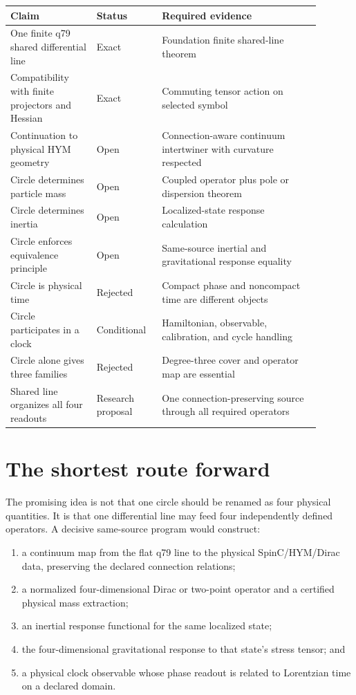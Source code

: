 \documentclass[11pt]{article}
\begin{document}
\begin{center}
\begin{tabular}{p{0.25\linewidth}p{0.18\linewidth}p{0.46\linewidth}}
\hline
Claim & Status & Required evidence\\
\hline
One finite q79 shared differential line & Exact & Foundation finite
shared-line theorem\\
Compatibility with finite projectors and Hessian & Exact & Commuting tensor
action on selected symbol\\
Continuation to physical HYM geometry & Open & Connection-aware continuum
intertwiner with curvature respected\\
Circle determines particle mass & Open & Coupled operator plus pole or
dispersion theorem\\
Circle determines inertia & Open & Localized-state response calculation\\
Circle enforces equivalence principle & Open & Same-source inertial and
gravitational response equality\\
Circle is physical time & Rejected & Compact phase and noncompact time are
different objects\\
Circle participates in a clock & Conditional & Hamiltonian, observable,
calibration, and cycle handling\\
Circle alone gives three families & Rejected & Degree-three cover and
operator map are essential\\
Shared line organizes all four readouts & Research proposal & One
connection-preserving source through all required operators\\
\hline
\end{tabular}
\end{center}

\section{The shortest route forward}

The promising idea is not that one circle should be renamed as four physical
quantities. It is that one differential line may feed four independently
defined operators. A decisive same-source program would construct:
\begin{enumerate}
\item a continuum map from the flat q79 line to the physical
  SpinC/HYM/Dirac data, preserving the declared connection relations;
\item a normalized four-dimensional Dirac or two-point operator and a
  certified physical mass extraction;
\item an inertial response functional for the same localized state;
\item the four-dimensional gravitational response to that state's stress
  tensor; and
\item a physical clock observable whose phase readout is related to
  Lorentzian time on a declared domain.
\end{enumerate}
\end{document}
